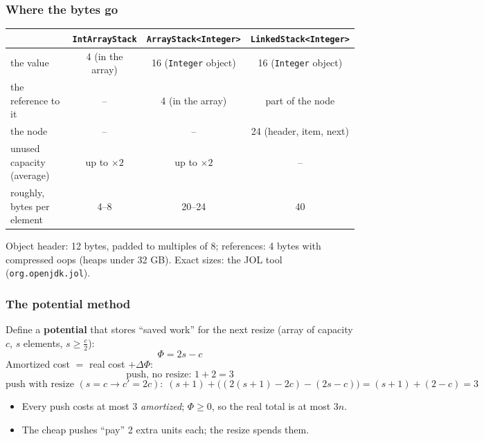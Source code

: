 \documentclass[aspectratio=169,10pt,compress]{beamer}
\begin{document}
\begin{frame}[t,fragile] \frametitle{Where the bytes go}
  \begin{center}\small
  \begin{tabular}{lccc}
    \toprule
                                  & \texttt{IntArrayStack} & \texttt{ArrayStack<Integer>} & \texttt{LinkedStack<Integer>} \\
    \midrule
    the value                     & 4 (in the array)       & 16 (\texttt{Integer} object) & 16 (\texttt{Integer} object) \\
    the reference to it           & --                     & 4 (in the array)             & part of the node \\
    the node                      & --                     & --                           & 24 (header, item, next) \\
    unused capacity (average)     & up to $\times 2$       & up to $\times 2$             & -- \\
    \midrule
    roughly, bytes per element    & 4--8                   & 20--24                       & 40 \\
    \bottomrule
  \end{tabular}
  \end{center}
  \vspace{0.3em}
  \small Object header: 12 bytes, padded to multiples of 8; references: 4 bytes with compressed oops (heaps under 32 GB).
  Exact sizes: the JOL tool (\texttt{org.openjdk.jol}).
\end{frame}





\begin{frame}[t,fragile] \frametitle{The potential method}
  Define a \textbf{potential} that stores ``saved work'' for the next resize (array of capacity $c$, $s$ elements, $s \ge \frac{c}{2}$):
  \[
  	\Phi = 2s - c
  \]
  Amortized cost $=$ real cost $+ \Delta\Phi$:
  \[
  	\text{push, no resize: } 1 + 2 = 3
  \]
  \[
  	\text{push with resize } (s = c \to c' = 2c): \; (s + 1) + \bigl( (2(s+1) - 2c) - (2s - c) \bigr) = (s + 1) + (2 - c) = 3
  \]
  \begin{itemize}\small
    \item Every push costs at most 3 \emph{amortized}; $\Phi \ge 0$, so the real total is at most $3n$.
    \item The cheap pushes ``pay'' 2 extra units each; the resize spends them.
  \end{itemize}
\end{frame}
\end{document}
